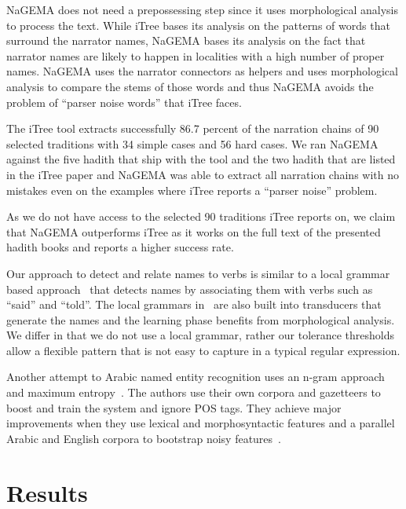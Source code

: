 \documentclass{llncs}
\begin{document}

NaGEMA does not need a prepossessing step since 
it uses morphological analysis to process the text. 
While iTree bases its analysis on the patterns 
of words that surround the narrator names, 
NaGEMA bases its analysis on the fact that narrator
names are likely to happen in localities with a high
number of proper names. 
NaGEMA uses the narrator connectors as helpers and
uses morphological analysis to compare the stems of
those words and thus NaGEMA avoids the problem of 
``parser noise words'' that iTree faces. 

The iTree tool extracts successfully 86.7 percent of
the narration chains of 90 selected traditions with 
34 simple cases and 56 hard cases. 
We ran NaGEMA against the five hadith that ship with
the tool and the two hadith that are listed in the iTree
paper and NaGEMA was able to extract all narration
chains with no mistakes even on the examples where iTree
reports a ``parser noise'' problem.

As we do not have access to the selected
90 traditions iTree reports on, we claim
that NaGEMA outperforms iTree as it works on
the full text of the presented hadith books
and reports a higher success rate. 

Our approach to detect and relate names to verbs
is similar to a local grammar based 
approach~\cite{Traboulsi:09} that detects names by
associating them with verbs 
such as  ``said'' and  ``told''. 
The local grammars in~\cite{Traboulsi:09} are also
built into transducers that generate the names and
the learning phase benefits from morphological analysis. 
We differ in that we do not use a local grammar, rather
our tolerance thresholds allow a flexible pattern that is
not easy to capture in a typical regular expression.

Another attempt to Arabic named entity recognition
uses an n-gram approach and maximum 
entropy~\cite{ANERSys:07}. 
The authors use their own corpora and gazetteers to boost 
and train the system and ignore POS tags. 
They achieve major improvements when they use lexical and
morphosyntactic features and a parallel Arabic and English 
corpora to bootstrap noisy features~\cite{Benajiba:2010}.

\section{Results}
\label{sec:results}
\end{document}
